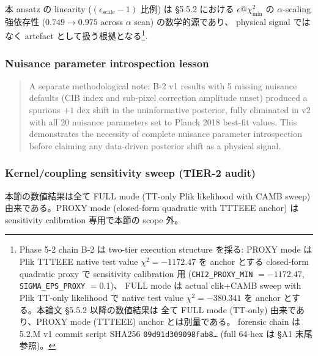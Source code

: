 \documentclass[11pt,a4paper]{ltjsarticle}
\begin{document}
\noindent
本 ansatz の linearity ($(\epsilon_{\mathrm{scale}} - 1)$ 比例) は \S 5.5.2 における
$\epsilon@\chi^2_{\mathrm{min}}$ の $\alpha$-scaling 強依存性
($0.749 \to 0.975$ across $\alpha$ scan) の数学的源であり、
physical signal ではなく artefact として扱う根拠となる\footnote{Phase 5-2 chain B-2 は
two-tier execution structure を採る: PROXY mode は Plik TTTEEE native test value
$\chi^2 = -1172.47$ を anchor とする closed-form quadratic proxy で sensitivity
calibration 用 (\texttt{CHI2\_PROXY\_MIN} $= -1172.47$, \texttt{SIGMA\_EPS\_PROXY} $= 0.1$)、
FULL mode は actual clik+CAMB sweep with Plik TT-only likelihood で
native test value $\chi^2 = -380.341$ を anchor とする。本論文 \S 5.5.2 以降の数値結果は
全て FULL mode (TT-only) 由来であり、PROXY mode (TTTEEE) anchor とは別量である。
forensic chain は 5.2.M v1 commit script SHA256
\texttt{09d91d309098fab8\ldots} (full 64-hex は \S A1 末尾参照)。}.


\subsubsection{Nuisance parameter introspection lesson}

\begin{quote}
A separate methodological note: B-2 v1 results with 5 missing nuisance
defaults (CIB index and sub-pixel correction amplitude unset) produced a
spurious $+1$ dex shift in the uninformative posterior, fully eliminated
in v2 with all 20 nuisance parameters set to Planck 2018 best-fit values.
This demonstrates the necessity of complete nuisance parameter
introspection before claiming any data-driven posterior shift as a
physical signal.
\end{quote}


\subsubsection{Kernel/coupling sensitivity sweep (TIER-2 audit)}

本節の数値結果は全て FULL mode (TT-only Plik likelihood with CAMB sweep)
由来である。PROXY mode (closed-form quadratic with TTTEEE anchor) は
sensitivity calibration 専用で本節の scope 外。
\end{document}
